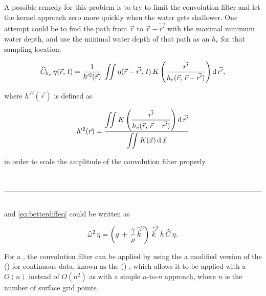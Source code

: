 A possible remedy for this problem is to try to limit the convolution filter and let the kernel approach zero more quickly when the water gets shallower. One attempt could be to find the path from $\vec{r}$ to $\vec{r}-\vec{r'}$ with the maximal minimum water depth, and use the minimal water depth of that path as an  $h_e$ for that sampling location:

\begin{equation} \label{eq:opcmoresophisticated}
\widehat{C}_{h_e}\,\eta(\vec{r},\,t) = \frac{1}{h'^2(\vec{r})}\,\iint\eta(\vec{r}-\vec{r'},\,t)\,K\left(\frac{\vec{r'}}{h_e(\vec{r},\,\vec{r}-\vec{r'})}\right) \operatorname{d}\vec{r'},
\end{equation}

where $h'^2(\vec{r})$ is defined as 

\begin{equation} \label{eq:hsqreffective}
h'^2(\vec{r}) = \frac{\displaystyle\iint K\left(\frac{\vec{r'}}{h_e(\vec{r},\,\vec{r}-\vec{r'})}\right) \operatorname{d}\vec{r'}}{\displaystyle\iint K(\vec{x}) \operatorname{d}\vec{x}}
\end{equation}

in order to scale the amplitude of the convolution filter properly.

\ \\
\hrule{}
\ \\

and \eqref{eq:betterdiffeq} could be written as

\begin{equation} \label{eq:bestdiffeq}
\widehat{\omega}^2\,\eta = \left(g\,+\,\frac{\gamma}{\rho}\,{\widehat{\vec{k}}}^2\right)\,{\widehat{\vec{k}}}^2\,h\,\widehat{C}\,\eta.
\end{equation}

For a , the convolution filter can be applied by using the a modified version of the  () \citep{Greengard1985,Greengard1987} for continuous data, known as the  () \citep{White1994}, which allows it to be applied with a $O(n)$   instead of $O(n^2)$ as with a simple $n$-to-$n$ approach, where $n$ is the number of surface grid points.

